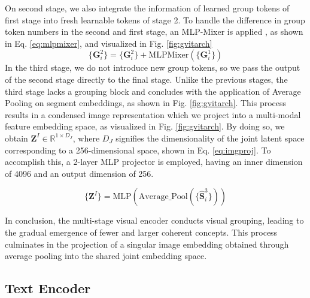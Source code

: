 On second stage, we also integrate the information of learned group tokens of first stage into fresh learnable tokens of stage 2. To handle the difference in group token numbers in the second and first stage, an MLP-Mixer is applied \cite{tolstikhin2021mlp}, as shown in Eq. \ref{eq:mlpmixer}, and visualized in Fig. \ref{fig:gvitarch}\\
\begin{equation}
\label{eq:mlpmixer}
    \{\textbf{G}_i^{2}\} =  \{\textbf{G}_i^{2}\} + \text{MLPMixer}(\{\textbf{G}_i^{1}\})
\end{equation}
In the third stage, we do not introduce new group tokens, so we pass the output of the second stage directly to the final stage. Unlike the previous stages, the third stage lacks a grouping block and concludes with the application of Average Pooling on segment embeddings, as shown in Fig. \ref{fig:gvitarch}. This process results in a condensed image representation which we project  into a multi-modal feature embedding space, as visualized in Fig. \ref{fig:gvitarch}. By doing so, we  obtain $\textbf{Z}^I \in \mathbb{R}^{1 \times D_J}$, where $D_J$ signifies the dimensionality of the joint latent space corresponding to a 256-dimensional space, shown in Eq. \ref{eq:imgproj}. To accomplish this, a 2-layer MLP projector is employed, having an inner dimension of 4096 and an output dimension of 256.

\begin{equation}
\label{eq:imgproj}
    \{\textbf{Z}^I \} = \text{MLP}(\text{Average\_Pool}( \{{\hat{\textbf{S}}_i^{3}}\}))
\end{equation}


In conclusion, the multi-stage visual encoder conducts visual grouping, leading to the gradual emergence of fewer and larger coherent concepts. This process culminates in the projection of a singular image embedding obtained through average pooling into the shared joint embedding space.


\subsection{Text Encoder}
\label{sec:textencoder}

